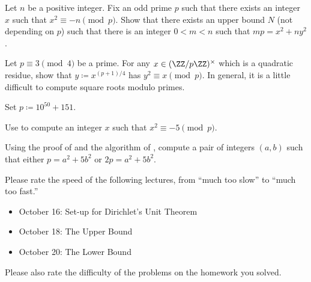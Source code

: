 \documentclass[../notes.tex]{subfiles}
\begin{document}
\begin{prob}[6 points]
	Let $n$ be a positive integer. Fix an odd prime $p$ such that there exists an integer $x$ such that $x^2\equiv-n\pmod p$. Show that there exists an upper bound $N$ (not depending on $p$) such that there is an integer $0<m<n$ such that $mp=x^2+ny^2$.
\end{prob}
\begin{prob}[2 points] \label{prob:3-mod-4-square-root}
	Let $p\equiv3\pmod4$ be a prime. For any $x\in(\ZZ/p\ZZ)^\times$ which is a quadratic residue, show that $y\coloneqq x^{(p+1)/4}$ has $y^2\equiv x\pmod p$. In general, it is a little difficult to compute square roots modulo primes.
\end{prob}
\begin{prob}[8 points] \label{prob:explicit-primes-of-form-5}
	Set $p\coloneqq10^{50}+151$.
	\begin{listalph}
		\item Use  to compute an integer $x$ such that $x^2\equiv-5\pmod p$.
		\item Using the proof of  and the algorithm of , compute a pair of integers $(a,b)$ such that either $p=a^2+5b^2$ or $2p=a^2+5b^2$.
	\end{listalph}
\end{prob}
\begin{prob}[0 points]
	Please rate the speed of the following lectures, from ``much too slow'' to ``much too fast.''
	\begin{itemize}
		\item October 16: Set-up for Dirichlet's Unit Theorem
		\item October 18: The Upper Bound
		\item October 20: The Lower Bound
	\end{itemize}
	Please also rate the difficulty of the problems on the homework you solved.
\end{prob}
\end{document}
